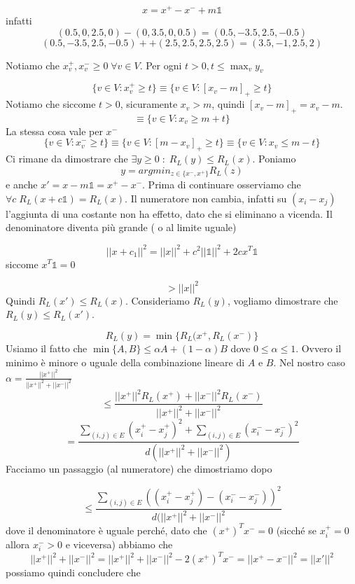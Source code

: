 \documentclass[12pt]{report}
\begin{document}
\begin{dimo}
\begin{exmp}
        $$x = x^+ - x^- + m \mathds{1}$$
        infatti
        $$
           (0.5,0,2.5,0) - (0,3.5,0,0.5) = (0.5,-3.5,2.5,-0.5) 
        $$
        $$
        (0.5,-3.5,2.5,-0.5) +
        + (2.5,2.5,2.5,2.5) = (3.5,-1,2.5,2)
        $$
    \end{exmp}
    
    \noindent
    Notiamo che $x_v^+,x_v^- \geq 0 \; \forall v \in V$. 
    Per ogni $t > 0, t \leq \max_v y_v$

    $$\{v \in V: x_v^+ \geq t\} \equiv \{v \in V: [x_v - m]_+ \geq t\}$$
    Notiamo che siccome $t > 0$, sicuramente $x_v > m$, quindi $[x_v - m]_+ = x_v - m$.
    $$ \equiv \{v \in V: x_v \geq m + t\}$$
    La stessa cosa vale per $x^-$
    $$\{v \in V: x_v^- \geq t\} \equiv \{v \in V: [m - x_v]_+ \geq t\} \equiv \{v \in V: x_v \leq  m - t\}$$
    Ci rimane da dimostrare che $\exists y \geq 0 \; : \; R_L(y) \leq R_L(x)$. Poniamo
    $$y = argmin_{z \in \{x^-, x^+\}}R_L(z)$$
    e anche $x' = x - m\mathds{1} = x^+ - x^-$.
    Prima di continuare osserviamo che $\forall c\; R_L(x + c\mathds{1}) = R_L(x)$. Il numeratore non cambia, infatti su $(x_i - x_j)$ l'aggiunta di una costante non ha effetto, dato che si eliminano a vicenda. Il denominatore diventa più grande ( o al limite uguale)

    $$||x + c_1||^2 = ||x||^2 + c^2||\mathds{1}||^2 + 2c x^T \mathds{1}$$
    siccome $x^T \mathds{1} = 0$ 

    $$> ||x||^2$$
    Quindi $R_L(x') \leq R_L(x)$.  Consideriamo $R_L(y)$, vogliamo dimostrare che $R_L(y) \leq R_L(x')$.

    $$R_L(y) = \min\{R_L(x^+,R_L(x^-)\}$$
    Usiamo il fatto che $\min\{A,B\} \leq \alpha A + (1-\alpha)B$ dove $0 \leq \alpha \leq 1$. Ovvero il minimo è minore o uguale della combinazione lineare di $A$ e $B$. Nel nostro caso $\alpha = \frac{||x^+||^2}{||x^+||^2 + ||x^-||^2}$
    $$\leq \frac{||x^+||^2 R_L(x^+) + ||x^-||^2 R_L(x^-)}{||x^+||^2 + ||x^-||^2} $$
    $$= \frac{\sum_{(i,j) \in E} (x_i^+ - x_j^+)^2 + \sum_{(i,j) \in E} (x_i^- - x_j^-)^2}{d(||x^+||^2 + ||x^-||^2)} $$
    Facciamo un passaggio (al numeratore) che dimostriamo dopo

    $$\leq \frac{\sum_{(i,j) \in E} ( (x_i^+ - x_j^+) - (x_i^- - x_j^-))^2}{d(||x^+||^2 + ||x^-||^2} $$
    dove il denominatore è uguale perché, dato che $(x^+)^T x^- = 0$ (sicché se $x_i^+ = 0$ allora $x_i^- > 0$ e viceversa) abbiamo che 
    $$||x^+||^2 + ||x^-||^2 =  ||x^+||^2 + ||x^-||^2 - 2(x^+)^T x^- = ||x^+ - x^-||^2 = ||x'||^2$$
    possiamo quindi concludere che 


\end{dimo}
\end{document}
